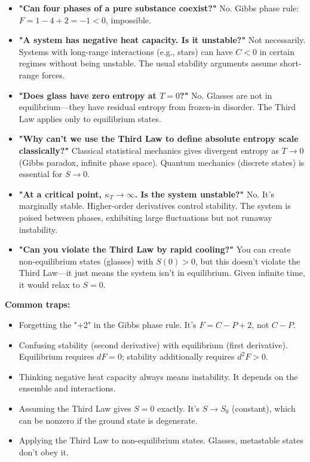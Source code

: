 \documentclass[9pt,twocoloumn]{article}
\begin{document}
\begin{itemize}
    \item \textbf{"Can four phases of a pure substance coexist?"} No. Gibbs phase rule: $F = 1 - 4 + 2 = -1 < 0$, impossible.

    \item \textbf{"A system has negative heat capacity. Is it unstable?"} Not necessarily. Systems with long-range interactions (e.g., stars) can have $C < 0$ in certain regimes without being unstable. The usual stability arguments assume short-range forces.

    \item \textbf{"Does glass have zero entropy at $T = 0$?"} No. Glasses are not in equilibrium—they have residual entropy from frozen-in disorder. The Third Law applies only to equilibrium states.

    \item \textbf{"Why can't we use the Third Law to define absolute entropy scale classically?"} Classical statistical mechanics gives divergent entropy as $T \to 0$ (Gibbs paradox, infinite phase space). Quantum mechanics (discrete states) is essential for $S \to 0$.

    \item \textbf{"At a critical point, $\kappa_T \to \infty$. Is the system unstable?"} No. It's marginally stable. Higher-order derivatives control stability. The system is poised between phases, exhibiting large fluctuations but not runaway instability.

    \item \textbf{"Can you violate the Third Law by rapid cooling?"} You can create non-equilibrium states (glasses) with $S(0) > 0$, but this doesn't violate the Third Law—it just means the system isn't in equilibrium. Given infinite time, it would relax to $S = 0$.
\end{itemize}

\textbf{Common traps:}

\begin{itemize}
    \item Forgetting the "+2" in the Gibbs phase rule. It's $F = C - P + 2$, not $C - P$.
    \item Confusing stability (second derivative) with equilibrium (first derivative). Equilibrium requires $dF = 0$; stability additionally requires $d^2F > 0$.
    \item Thinking negative heat capacity always means instability. It depends on the ensemble and interactions.
    \item Assuming the Third Law gives $S = 0$ exactly. It's $S \to S_0$ (constant), which can be nonzero if the ground state is degenerate.
    \item Applying the Third Law to non-equilibrium states. Glasses, metastable states don't obey it.
\end{itemize}
\end{document}
